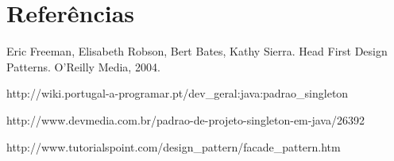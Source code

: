 \section{Referências}

\begin{thebibliography}{99} %

Eric Freeman, Elisabeth Robson, Bert Bates, Kathy Sierra. Head First Design Patterns. O'Reilly Media, 2004.

http://wiki.portugal-a-programar.pt/dev\_geral:java:padrao\_singleton

http://www.devmedia.com.br/padrao-de-projeto-singleton-em-java/26392

http://www.tutorialspoint.com/design\_pattern/facade\_pattern.htm

\end{thebibliography}
